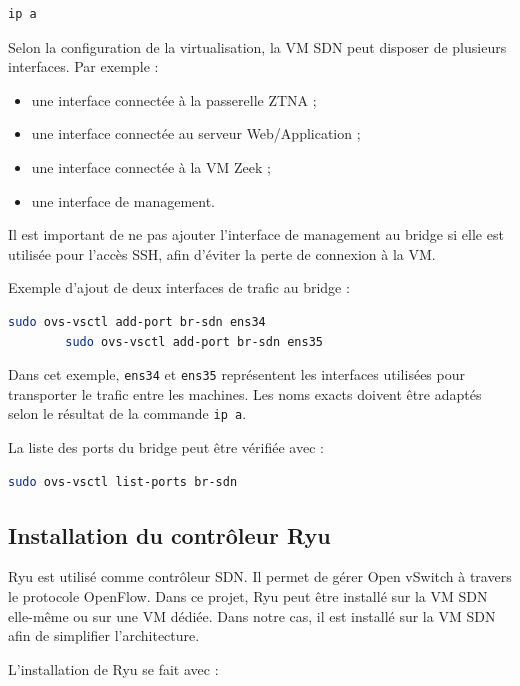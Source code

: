 \documentclass[12pt,a4paper,oneside]{report}
\begin{document}
	\begin{lstlisting}[language=bash]
		ip a
	\end{lstlisting}
	
	Selon la configuration de la virtualisation, la VM SDN peut disposer de plusieurs interfaces. Par exemple :
	
	\begin{itemize}
		\item une interface connectée à la passerelle ZTNA ;
		\item une interface connectée au serveur Web/Application ;
		\item une interface connectée à la VM Zeek ;
		\item une interface de management.
	\end{itemize}
	
	Il est important de ne pas ajouter l'interface de management au bridge si elle est utilisée pour l'accès SSH, afin d'éviter la perte de connexion à la VM.
	
	Exemple d'ajout de deux interfaces de trafic au bridge :
	
	\begin{lstlisting}[language=bash]
		sudo ovs-vsctl add-port br-sdn ens34
		sudo ovs-vsctl add-port br-sdn ens35
	\end{lstlisting}
	
	Dans cet exemple, \texttt{ens34} et \texttt{ens35} représentent les interfaces utilisées pour transporter le trafic entre les machines. Les noms exacts doivent être adaptés selon le résultat de la commande \texttt{ip a}.
	
	La liste des ports du bridge peut être vérifiée avec :
	
	\begin{lstlisting}[language=bash]
		sudo ovs-vsctl list-ports br-sdn
	\end{lstlisting}
	
	\subsection{Installation du contrôleur Ryu}
	
	Ryu est utilisé comme contrôleur SDN. Il permet de gérer Open vSwitch à travers le protocole OpenFlow. Dans ce projet, Ryu peut être installé sur la VM SDN elle-même ou sur une VM dédiée. Dans notre cas, il est installé sur la VM SDN afin de simplifier l'architecture.
	
	L'installation de Ryu se fait avec :
	
\end{document}
